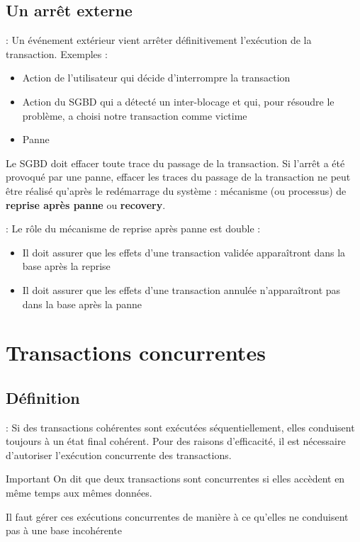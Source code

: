 \documentclass[10pt]{beamer}
\begin{document}
\subsection{Un arrêt externe}
\begin{frame}{\secname : \subsecname}
    Un événement extérieur vient arrêter définitivement l'exécution de la transaction.  Exemples :
    \begin{itemize}
        \item Action de l'utilisateur qui décide d'interrompre la transaction
        \item Action du SGBD qui a détecté un inter-blocage et qui, pour résoudre le problème, a choisi notre transaction comme victime
        \item Panne
    \end{itemize}
    Le SGBD doit effacer toute trace du passage de la transaction.
    Si l'arrêt a été provoqué par une panne, effacer les traces du passage de la transaction ne peut être réalisé qu'après le redémarrage du système : mécanisme (ou processus) de \textbf{reprise après panne} ou \textbf{recovery}.
\end{frame}
\begin{frame}{\secname : \subsecname}
    Le rôle du mécanisme de reprise après panne est double :
    \begin{itemize}
        \item Il doit assurer que les effets d'une transaction validée apparaîtront dans la base après la reprise
        \item Il doit assurer que les effets d'une transaction annulée n'apparaîtront pas dans la base après la panne
    \end{itemize}
\end{frame}
\section{Transactions concurrentes}
\tocss
\subsection{Définition}
\begin{frame}{\secname : \subsecname}
    Si des transactions cohérentes sont exécutées séquentiellement, elles conduisent toujours à un état final cohérent.
    Pour des raisons d'efficacité, il est nécessaire d'autoriser l'exécution concurrente des transactions.
    \begin{alertblock}{Important}
        On dit que deux transactions sont concurrentes si elles accèdent en même temps aux mêmes données.
    \end{alertblock}
    Il faut gérer ces exécutions concurrentes de manière à ce qu'elles ne conduisent pas à une base incohérente
\end{frame}
\end{document}
